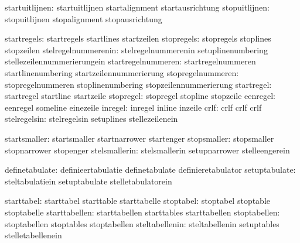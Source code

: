                startuitlijnen:  startuitlijnen               startalignment
                                startausrichtung
                stopuitlijnen:  stopuitlijnen                stopalignment
                                stopausrichtung

                  startregels:  startregels                  startlines
                                startzeilen
                   stopregels:  stopregels                   stoplines
                                stopzeilen
          stelregelnummerenin:  stelregelnummerenin          setuplinenumbering
                                stellezeilennummerierungein
           startregelnummeren:  startregelnummeren           startlinenumbering
                                startzeilennummerierung
            stopregelnummeren:  stopregelnummeren            stoplinenumbering
                                stopzeilennummerierung
                   startregel:  startregel                   startline
                                startzeile
                    stopregel:  stopregel                    stopline
                                stopzeile
                     eenregel:  eenregel                     someline
                                einezeile
                      inregel:  inregel                      inline
                                inzeile
                         crlf:  crlf                         crlf
                                crlf
                 stelregelsin:  stelregelsin                 setuplines
                                stellezeilenein

                 startsmaller:  startsmaller                 startnarrower
                                startenger
                  stopsmaller:  stopsmaller                  stopnarrower
                                stopenger
                stelsmallerin:  stelsmallerin                setupnarrower
                                stelleengerein

               definetabulate:  definieertabulatie           definetabulate
                                definieretabulator
                setuptabulate:  steltabulatiein              setuptabulate
                                stelletabulatorein

                   starttabel:  starttabel                   starttable
                                starttabelle
                    stoptabel:  stoptabel                    stoptable
                                stoptabelle
                starttabellen:  starttabellen                starttables
                                starttabellen
                 stoptabellen:  stoptabellen                 stoptables
                                stoptabellen
               steltabellenin:  steltabellenin               setuptables
                                stelletabellenein

